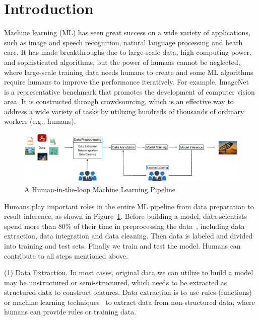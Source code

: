 \section{Introduction}
\label{sec:intro}

Machine learning (ML) has seen great success on a wide variety of applications, such as image and speech recognition, natural language processing and heath care. It has made breakthroughs due to large-scale data, high computing power, and sophisticated algorithms, but the power of humans cannot be neglected, where large-scale training data needs humans to create and some ML algorithms require humans to improve the performance iteratively. For example, ImageNet~\cite{DBLP:imagenet} is a representative benchmark that promotes the development of computer vision area. It is constructed through crowdsourcing, which is an effective way to address a wide variety of tasks by utilizing hundreds of thousands of ordinary workers (e.g., humans).
 
\begin{figure}[h!]
	\centering
	\includegraphics[scale=0.27]{submissions/guoliang/figs/framework.eps}
	\caption{A Human-in-the-loop Machine Learning Pipeline}
	\label{fig:framwork}
\end{figure}

Humans play important roles in the entire ML pipeline from data preparation to result inference, as shown in Figure~\ref{fig:framwork}. Before building a model, data scientists spend more than 80\% of their time in preprocessing the data~\cite{clean}, including data extraction, data integration and data cleaning. Then data is labeled and divided into training and test sets. Finally we train and test the model. Humans can contribute to all steps mentioned above.


(1) Data Extraction. In most cases,  original data we can utilize to build a model may be unstructured or semi-structured, which needs to be extracted as structured data to construct features. Data extraction is to use rules (functions) or machine learning techniques~\cite{DBLP:conf/acl/LiRC11,DBLP:conf/wsdm/NakasholeTW11, DBLP:conf/aaai/MitchellCHTBCMG15} to extract data from non-structured data, where humans can provide rules or training data. 


